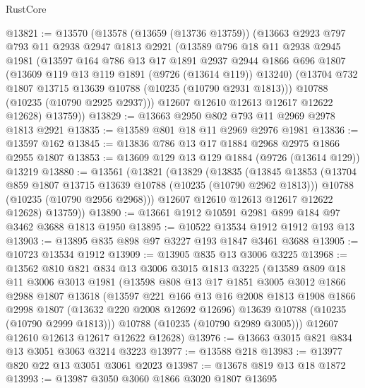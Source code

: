 \begin{lexlean}{RustCore}
\begin{coremodule}
@13821 := @13570
    (@13578
      (@13659 (@13736 @13759))
      (@13663
        @2923
        @797
        @793
        @11
        @2938
        @2947
        @1813
        @2921
        (@13589
          @796
          @18
          @11
          @2938
          @2945
          @1981
          (@13597
            @164
            @786
            @13
            @17
            @1891
            @2937
            @2944
            @1866
            @696
            @1807
            (@13609 @119 @13 @119 @1891 (@9726 (@13614 @119)) @13240)
            (@13704 @732 @1807 @13715 @13639 @10788 (@10235 (@10790 @2931 @1813)))
            @10788
            (@10235 (@10790 @2925 @2937)))
          @12607
          @12610
          @12613
          @12617
          @12622
          @12628)
        @13759))
@13829 := @13663 @2950 @802 @793 @11 @2969 @2978 @1813 @2921
@13835 := @13589 @801 @18 @11 @2969 @2976 @1981
@13836 := @13597 @162
@13845 := @13836 @786 @13 @17 @1884 @2968 @2975 @1866 @2955 @1807
@13853 := @13609 @129 @13 @129 @1884 (@9726 (@13614 @129)) @13219
@13880 := @13561
    (@13821
      (@13829
        (@13835
          (@13845
            @13853
            (@13704 @859 @1807 @13715 @13639 @10788 (@10235 (@10790 @2962 @1813)))
            @10788
            (@10235 (@10790 @2956 @2968)))
          @12607
          @12610
          @12613
          @12617
          @12622
          @12628)
        @13759))
@13890 := @13661 @1912 @10591 @2981 @899 @184 @97 @3462 @3688 @1813 @1950
@13895 := @10522 @13534 @1912 @1912 @193 @13
@13903 := @13895 @835 @898 @97 @3227 @193 @1847 @3461 @3688
@13905 := @10723 @13534 @1912
@13909 := @13905 @835 @13 @3006 @3225
@13968 := @13562
    @810
    @821
    @834
    @13
    @3006
    @3015
    @1813
    @3225
    (@13589
      @809
      @18
      @11
      @3006
      @3013
      @1981
      (@13598
        @808
        @13
        @17
        @1851
        @3005
        @3012
        @1866
        @2988
        @1807
        @13618
        (@13597
          @221
          @166
          @13
          @16
          @2008
          @1813
          @1908
          @1866
          @2998
          @1807
          (@13632 @220 @2008 @12692 @12696)
          @13639
          @10788
          (@10235 (@10790 @2999 @1813)))
        @10788
        (@10235 (@10790 @2989 @3005)))
      @12607
      @12610
      @12613
      @12617
      @12622
      @12628)
@13976 := @13663 @3015 @821 @834 @13 @3051 @3063 @3214 @3223
@13977 := @13588 @218
@13983 := @13977 @820 @22 @13 @3051 @3061 @2023
@13987 := @13678 @819 @13 @18 @1872
@13993 := @13987 @3050 @3060 @1866 @3020 @1807 @13695

\end{coremodule}
\end{lexlean}
